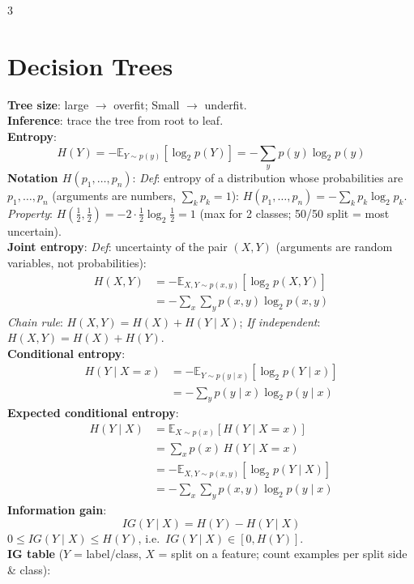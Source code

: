 \documentclass[10pt]{article}
\newcommand{\sub}[1]{\textit{#1}:}  %
\begin{document}
\begin{multicols*}{3}
\section{Decision Trees}
\textbf{Tree size}: large $\to$ overfit; Small $\to$ underfit.\\
\textbf{Inference}: trace the tree from root to leaf.\\
\textbf{Entropy}:
\[ H(Y) = -\mathbb E_{Y\sim p(y)}\left[\log_2 p(Y)\right] = -\textstyle\sum_{y} p(y)\log_2 p(y) \]
\textbf{Notation $H(p_1,\dots,p_n)$}: \sub{Def} entropy of a distribution whose probabilities are $p_1,\dots,p_n$ (arguments are numbers, $\sum_k p_k=1$): $H(p_1,\dots,p_n)=-\sum_k p_k\log_2 p_k$.\\
\sub{Property} $H(\frac12,\frac12)=-2\cdot\frac12\log_2\frac12=1$ (max for 2 classes; 50/50 split = most uncertain).\\
\textbf{Joint entropy}: \sub{Def} uncertainty of the pair $(X,Y)$ (arguments are random variables, not probabilities):
\begin{align*}
H(X,Y) &= -\mathbb E_{X,Y\sim p(x,y)}\left[\log_2 p(X,Y)\right]\\
&= -\textstyle\sum_x\sum_y p(x,y)\log_2 p(x,y)
\end{align*}
\sub{Chain rule} $H(X,Y)=H(X)+H(Y\mid X)$; \sub{If independent} $H(X,Y)=H(X)+H(Y)$.\\
\textbf{Conditional entropy}:
\begin{align*}
H(Y\mid X\!=\!x) &= -\mathbb E_{Y\sim p(y\mid x)}\left[\log_2 p(Y\mid x)\right]\\
&= -\textstyle\sum_{y} p(y\mid x)\log_2 p(y\mid x)
\end{align*}
\textbf{Expected conditional entropy}:
\begin{align*}
H(Y\mid X) &= \mathbb E_{X\sim p(x)}\left[H(Y\mid X\!=\!x)\right]\\
&= \textstyle\sum_{x} p(x)\,H(Y\mid X\!=\!x)\\
&= -\mathbb E_{X,Y\sim p(x,y)}\left[\log_2 p(Y\mid X)\right]\\
&= -\textstyle\sum_x\sum_y p(x,y)\log_2 p(y\mid x)
\end{align*}
\textbf{Information gain}:
\[ IG(Y\mid X) = H(Y) - H(Y\mid X) \]
$0\le IG(Y\mid X)\le H(Y)$, i.e.\ $IG(Y\mid X)\in[0,H(Y)]$.\\
\textbf{IG table} ($Y$ = label/class, $X$ = split on a feature; count examples per split side \& class):\\
{\fontsize{4}{4.7}\selectfont\setlength{\tabcolsep}{4pt}\begin{tabular}{@{}l|cc|c@{}}

\end{tabular}}
\end{multicols*}
\end{document}
